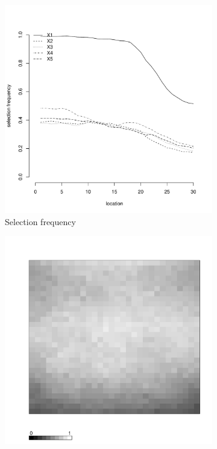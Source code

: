 \documentclass[authoryear, review, 11pt]{elsarticle}
\begin{document}
\begin{figure}
\begin{subfigure}[b]{0.45\textwidth}
		\includegraphics[width=\textwidth]{../../figures/simulation/15.20.profile_selection.pdf}
		\caption{Selection frequency}
	\end{subfigure}
	\begin{subfigure}[b]{0.45\textwidth}
	\centering
		\includegraphics[width=\textwidth]{../../figures/simulation/X1.15.20.unshrunk_bootstrap_coverage.pdf}

\end{subfigure}
\end{figure}
\end{document}
